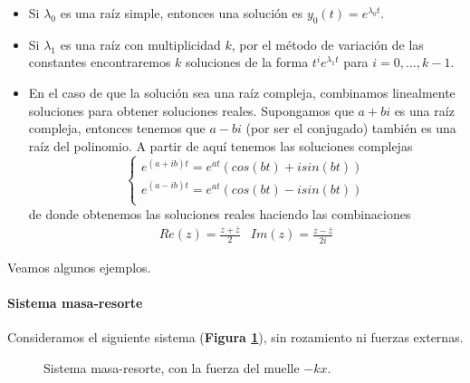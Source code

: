 \documentclass{mathnotes}
\begin{document}
\begin{itemize}
\item Si $λ_0$ es una raíz simple, entonces una solución es $y_0(t) = e^{λ_0t}$.
\item Si $λ_1$ es una raíz con multiplicidad $k$, por el método de variación de las constantes encontraremos $k$ soluciones de la forma $t^ie^{λ_1t}$ para $i=0,\hdots,k-1$.
\item En el caso de que la solución sea una raíz compleja, combinamos linealmente soluciones para obtener soluciones reales.
Supongamos que $a+bi$ es una raíz compleja, entonces tenemos que $a-bi$ (por ser el conjugado) también es una raíz del polinomio. A partir de aquí tenemos las soluciones complejas \begin{equation}
\left\lbrace \begin{array}{l}
e^{(a+ib)t} = e^{at}(cos(bt)+isin(bt))\\
e^{(a-ib)t} = e^{at}(cos(bt)-isin(bt))\\
\end{array}\right. 
\end{equation}
de donde obtenemos las soluciones reales haciendo las combinaciones
$$\begin{array}{c|c}
Re(z) = \frac{z+\bar{z}}{2} & Im(z) = \frac{z-\bar{z}}{2i}
\end{array}$$
\end{itemize}

Veamos algunos ejemplos.

\paragraph{Sistema masa-resorte}

Consideramos el siguiente sistema (\textbf{Figura \ref{imgMasaResorte1}}), sin rozamiento ni fuerzas externas.

\begin{figure}[hbtp]
\centering
{}
\caption{Sistema masa-resorte, con la fuerza del muelle $-kx$.}
\label{imgMasaResorte1}
\end{figure}
\end{document}

